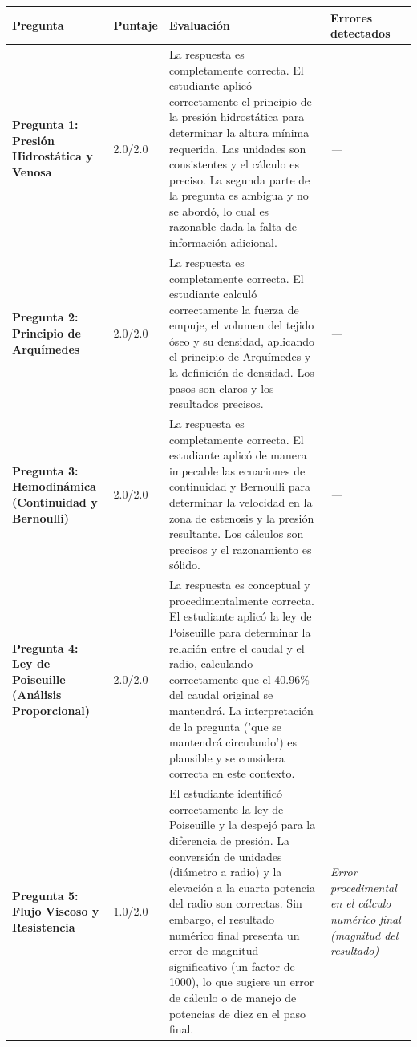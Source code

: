 \documentclass[11pt,a4paper]{article}
\begin{document}
\begin{longtable}{>{\bfseries}p{2.8cm} p{1.6cm} p{7.0cm} p{2.8cm}}
  \toprule
  \textbf{Pregunta} & \textbf{Puntaje} & \textbf{Evaluación} & \textbf{Errores detectados} \\
  \midrule
  \endhead
  \bottomrule
  \endfoot
    \textbf{Pregunta 1: Presión Hidrostática y Venosa} & 2.0/2.0 & La respuesta es completamente correcta. El estudiante aplicó correctamente el principio de la presión hidrostática para determinar la altura mínima requerida. Las unidades son consistentes y el cálculo es preciso. La segunda parte de la pregunta es ambigua y no se abordó, lo cual es razonable dada la falta de información adicional. & \textit{---} \\
    \midrule
    \textbf{Pregunta 2: Principio de Arquímedes} & 2.0/2.0 & La respuesta es completamente correcta. El estudiante calculó correctamente la fuerza de empuje, el volumen del tejido óseo y su densidad, aplicando el principio de Arquímedes y la definición de densidad. Los pasos son claros y los resultados precisos. & \textit{---} \\
    \midrule
    \textbf{Pregunta 3: Hemodinámica (Continuidad y Bernoulli)} & 2.0/2.0 & La respuesta es completamente correcta. El estudiante aplicó de manera impecable las ecuaciones de continuidad y Bernoulli para determinar la velocidad en la zona de estenosis y la presión resultante. Los cálculos son precisos y el razonamiento es sólido. & \textit{---} \\
    \midrule
    \textbf{Pregunta 4: Ley de Poiseuille (Análisis Proporcional)} & 2.0/2.0 & La respuesta es conceptual y procedimentalmente correcta. El estudiante aplicó la ley de Poiseuille para determinar la relación entre el caudal y el radio, calculando correctamente que el 40.96\% del caudal original se mantendrá. La interpretación de la pregunta ('que se mantendrá circulando') es plausible y se considera correcta en este contexto. & \textit{---} \\
    \midrule
    \textbf{Pregunta 5: Flujo Viscoso y Resistencia} & 1.0/2.0 & El estudiante identificó correctamente la ley de Poiseuille y la despejó para la diferencia de presión. La conversión de unidades (diámetro a radio) y la elevación a la cuarta potencia del radio son correctas. Sin embargo, el resultado numérico final presenta un error de magnitud significativo (un factor de 1000), lo que sugiere un error de cálculo o de manejo de potencias de diez en el paso final. & \textit{Error procedimental en el cálculo numérico final (magnitud del resultado)} \\
    \midrule
\end{longtable}
\end{document}
